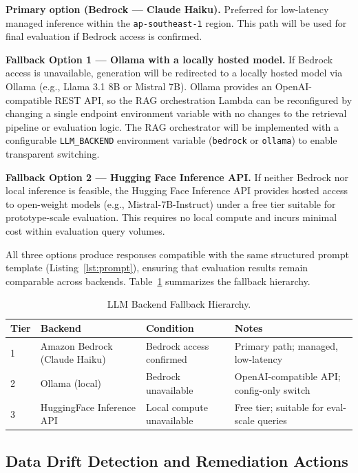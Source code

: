 \documentclass[12pt,a4paper]{report}
\begin{document}
\textbf{Primary option (Bedrock — Claude Haiku).} Preferred for low-latency managed inference within the \texttt{ap-southeast-1} region. This path will be used for final evaluation if Bedrock access is confirmed.

\textbf{Fallback Option 1 — Ollama with a locally hosted model.} If Bedrock access is unavailable, generation will be redirected to a locally hosted model via Ollama (e.g., Llama 3.1 8B or Mistral 7B). Ollama provides an OpenAI-compatible REST API, so the RAG orchestration Lambda can be reconfigured by changing a single endpoint environment variable with no changes to the retrieval pipeline or evaluation logic. The RAG orchestrator will be implemented with a configurable \texttt{LLM\_BACKEND} environment variable (\texttt{bedrock} or \texttt{ollama}) to enable transparent switching.

\textbf{Fallback Option 2 — Hugging Face Inference API.} If neither Bedrock nor local inference is feasible, the Hugging Face Inference API provides hosted access to open-weight models (e.g., Mistral-7B-Instruct) under a free tier suitable for prototype-scale evaluation. This requires no local compute and incurs minimal cost within evaluation query volumes.

All three options produce responses compatible with the same structured prompt template (Listing~\ref{lst:prompt}), ensuring that evaluation results remain comparable across backends. Table~\ref{tab:llm_backends} summarizes the fallback hierarchy.

\begin{table}[H]
\caption{LLM Backend Fallback Hierarchy.}
\label{tab:llm_backends}
\centering
\begin{tabular}{p{0.5cm}p{3.5cm}p{4.0cm}p{4.0cm}}
\toprule
\textbf{Tier} & \textbf{Backend} & \textbf{Condition} & \textbf{Notes} \\
\midrule
1 & Amazon Bedrock (Claude Haiku) & Bedrock access confirmed & Primary path; managed, low-latency \\
2 & Ollama (local) & Bedrock unavailable & OpenAI-compatible API; config-only switch \\
3 & HuggingFace Inference API & Local compute unavailable & Free tier; suitable for eval-scale queries \\
\bottomrule
\end{tabular}
\end{table}

\subsection{Data Drift Detection and Remediation Actions}
\label{sec:drift}
\end{document}
